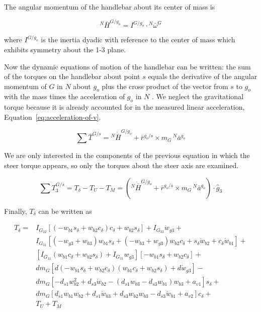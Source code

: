 \documentclass[10pt]{article}
\begin{document}
The angular momentum of the handlebar about its center of mass is

\begin{equation}
  ^N\bar{H}^{G/g_o} = I^{G/g_o} \cdot {}^N\bar{\omega}^G
\end{equation}

where $I^{G/g_o}$ is the inertia dyadic with reference to the center of mass
which exhibits symmetry about the 1-3 plane.

Now the dynamic equations of motion of the handlebar can be written: the sum of
the torques on the handlebar about point $s$ equals the derivative of the
angular momentum of $G$ in $N$ about $g_o$ plus the cross product of the vector
from $s$ to $g_o$ with the mass times the acceleration of $g_o$ in $N$
\cite{Meriam1975}. We neglect the gravitational torque because it is already
accounted for in the measured linear acceleration,
Equation~\ref{eq:acceleration-of-v}.

\begin{equation}
  \sum \bar{T}^{G/s} = {}^N\dot{\bar{H}}^{G/g_o} +
    \bar{r}^{g_o/s} \times m_G\,{}^N\bar{a}^{g_o}
\end{equation}

We are only interested in the components of the previous equation in which the
steer torque appears, so only the torques about the steer axis are examined.

\begin{equation}
  \sum T^{G/s}_3 = T_\delta - T_U - T_M = \left({}^N\dot{\bar{H}}^{G/g_o} +
  \bar{r}^{g_o/s} \times m_G\,{}^N\bar{a}^{g_o}\right) \cdot \hat{g}_3
\end{equation}

Finally, $T_\delta$ can be written as

\begin{align}
  T_{\delta} =
    & I_{G_{22}} \left[ \left( -w_{b1} s_\delta + w_{b2} c_\delta \right)
      c_\delta + w_{b2} s_\delta \right] + I_{G_{33}} \dot{w}_{g3} + \nonumber \\
    & I_{G_{31}} \left[ (-w_{g3} + w_{b3} ) w_{b1} s_\delta +
      (-w_{b3} + w_{g3}) w_{b2} c_\delta +
      s_\delta \dot{w}_{b2} + c_\delta \dot{w}_{b1} \right] + \nonumber \\
    & \left[ I_{G_{11}} (w_{b1} c_\delta + w_{b2}s_\delta) +
      I_{G_{31}} w_{g3} \right] \left[-w_{b1} s_\delta +
      w_{b2} c_\delta \right] + \nonumber \\
    & d m_G \left[ d (-w_{b1} s_\delta + w_{b2} c_\delta)
      (w_{b1} c_\delta + w_{b2} s_\delta) + d \dot{w}_{g3} \right] - \nonumber \\
    & d m_G \left[-d_{s1} w_{b2}^{2} + d_{s3} \dot{w}_{b2} -
      (d_{s1} w_{b3} - d_{s3} w_{b1}) w_{b3} + a_{v1} \right] s_\delta + \nonumber \\
    & d m_G \left[d_{s1} w_{b1} w_{b2} + d_{s1} \dot{w}_{b3} +
      d_{s3} w_{b2} w_{b3} - d_{s3} \dot{w}_{b1} + a_{v2} \right]
      c_\delta + \nonumber \\
    & T_U + T_M
\end{align}
\end{document}
